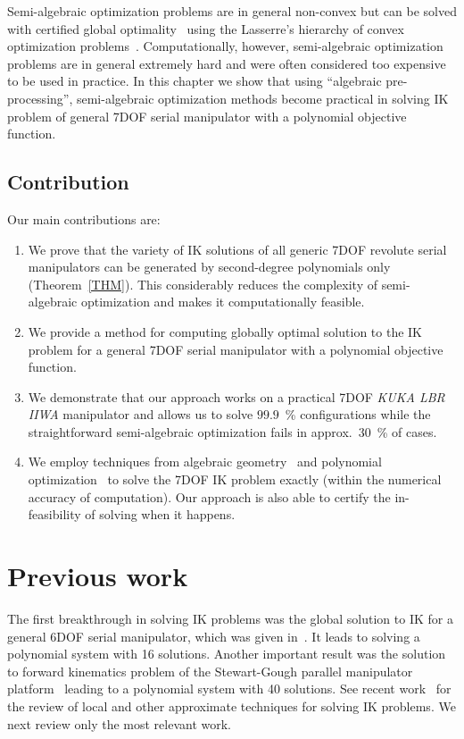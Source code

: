 Semi-algebraic optimization problems are in general non-convex but can be solved with certified global optimality~\cite{Lasserre2015} using the  Lasserre's hierarchy of convex optimization problems~\cite{Lasserre}.
Computationally, however, semi-algebraic optimization problems are in general extremely hard and were often considered too expensive to be used in practice. In this chapter we show that using ``algebraic pre-processing'', semi-algebraic optimization methods become practical in solving IK problem of general 7DOF serial manipulator with a polynomial objective function.


\subsection{Contribution}
Our main contributions are:
\begin{enumerate}
\item We prove that the variety of IK solutions of all generic 7DOF revolute serial manipulators can be generated by second-degree polynomials only (Theorem~\ref{THM}). This considerably reduces the complexity of semi-algebraic optimization and makes it computationally feasible.

\item We provide a method for computing globally optimal solution to the IK problem for a general 7DOF serial manipulator with a polynomial objective function.

\item We demonstrate that our approach works on a practical 7DOF \textit{KUKA LBR IIWA} manipulator and allows us to solve $99.9$~\% configurations while the straightforward semi-algebraic optimization fails in approx.\ 30~\% of cases.

\item We employ techniques from algebraic geometry~\cite{Cox-Little-Shea2015} and polynomial optimization~\cite{Lasserre2015} to solve the 7DOF IK problem exactly (within the numerical accuracy of computation). Our approach is also able to certify the in-feasibility of solving when it happens. 
\end{enumerate}

\section{Previous work}
The first breakthrough in solving IK problems was the global solution to IK for a general 6DOF serial manipulator, which was given in~\cite{Raghaven1990,Manocha-Canny1994}. It leads to solving a polynomial system with 16 solutions.
Another important result was the solution to forward kinematics problem of the Stewart-Gough parallel manipulator platform~\cite{Lazard1993} leading to a polynomial system with 40 solutions. See recent work~\cite{Dai2019} for the review of local and other approximate techniques for solving IK problems. We next review only the most relevant work.

